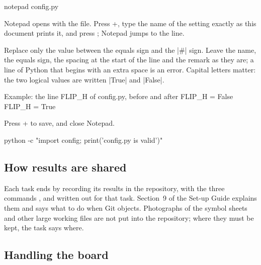 \begin{ps}
notepad config.py
\end{ps}
Notepad opens with the file. Press +, type the name of the setting exactly as
this document prints it, and press ; Notepad jumps to the line.

Replace only the value between the equals sign and the \code|#| sign. Leave the name, the
equals sign, the spacing at the start of the line and the remark as they are; a line of Python
that begins with an extra space is an error. Capital letters matter: the two logical values are
written \code|True| and \code|False|.
\begin{filebox}{Example: the line FLIP\_H of config.py, before and after}
FLIP_H = False
FLIP_H = True
\end{filebox}
Press + to save, and close Notepad.

\label{st:valid}
\begin{ps}
python -c "import config; print('config.py is valid')"
\end{ps}

\subsection{How results are shared}

Each task ends by recording its results in the repository, with the three commands ,  and  written out for that task. Section~9 of the Set-up
Guide explains them and says what to do when Git objects. Photographs of the symbol sheets and
other large working files are not put into the repository; where they must be kept, the task
says where.

\subsection{Handling the board}

